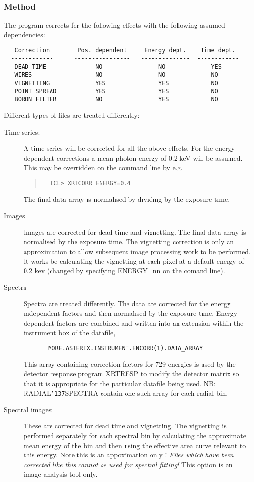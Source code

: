 \documentclass{book}
\renewcommand{\_}{{\tt\char'137}}     %
\begin{document}
\subsubsection{Method}
The program corrects for the following effects with the following
assumed dependencies:
\begin{verbatim}
   Correction        Pos. dependent     Energy dept.    Time dept.
  ------------      ----------------   --------------  ------------
   DEAD TIME              NO                NO             YES
   WIRES                  NO                NO             NO
   VIGNETTING             YES               YES            NO
   POINT SPREAD           YES               YES            NO
   BORON FILTER           NO                YES            NO
\end{verbatim}
Different types of files are treated differently:

\begin{description}
\item[Time series:]
A time series will be corrected for all the above effects. For the
energy dependent corrections a mean photon energy of 0.2 keV will be
assumed. This may be overridden on the command line by e.g.
\begin{quote}\begin{verbatim}
  ICL> XRTCORR ENERGY=0.4
\end{verbatim}\end{quote}
The final data array is normalised by dividing by the exposure time.
\item[Images]
Images are corrected for dead time and vignetting.
The final data array is normalised by the exposure time.
The vignetting correction is only an approximation to allow
subsequent image processing work to be performed. It works
be calculating the vignetting at each pixel at a default energy of
0.2 kev (changed by specifying ENERGY=nn on the comand line).
\item[Spectra]
Spectra are treated differently. The data are corrected for the
energy independent factors and then normalised by the exposure time.
Energy dependent factors are combined and written into an extension
within the instrument box of the datafile,
\begin{verbatim}
       MORE.ASTERIX.INSTRUMENT.ENCORR(1).DATA_ARRAY
\end{verbatim}
This array containing correction factors for 729 energies is used by
the detector response program XRTRESP to modify the detector matrix
so that it is appropriate for the particular datafile being used.
NB: RADIAL\_SPECTRA contain one such array for each radial bin.

\item[Spectral images:]
These are corrected for dead time and vignetting. The vignetting
is performed separately for each spectral bin by calculating the
approximate mean energy of the bin and then using the effective
area curve relevant to this energy. Note this is an appoximation
only ! {\em Files which have been corrected like this cannot be used for
spectral fitting!} This option is an image analysis tool only.
\end{description}
\end{document}
